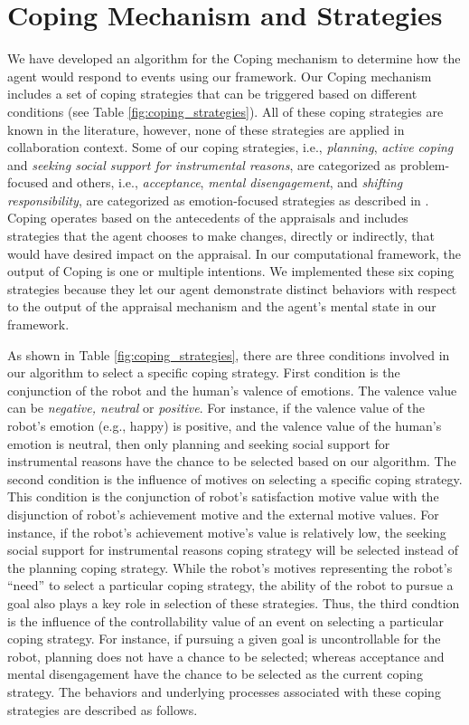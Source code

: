 \documentclass[12pt]{report}
\begin{document}
\section{Coping Mechanism and Strategies}
\label{sec:coping-mechanism}
We have developed an algorithm for the Coping mechanism to determine how the
agent would respond to events using our framework. Our Coping mechanism includes
a set of coping strategies that can be triggered based on different conditions
(see Table \ref{fig:coping_strategies}). All of these coping strategies are
known in the literature, however, none of these strategies are applied in
collaboration context. Some of our coping strategies, i.e., \textit{planning},
\textit{active coping} and \textit{seeking social support for instrumental
reasons}, are categorized as problem-focused and others, i.e.,
\textit{acceptance}, \textit{mental disengagement}, and \textit{shifting
responsibility}, are categorized as emotion-focused strategies as described in
\cite{gratch:domain-independent}. {\color{red}Coping operates based on the
antecedents of the appraisals and includes strategies that the agent chooses to make changes,
directly or indirectly, that would have desired impact on the appraisal. In
our computational framework, the output of Coping is one or multiple
intentions.} We implemented these six coping strategies because they let our
agent demonstrate distinct behaviors with respect to the output of the appraisal
mechanism and the agent's mental state in our framework.

{\color{red}As shown in Table \ref{fig:coping_strategies}, there are three
conditions involved in our algorithm to select a specific coping strategy. First condition
is the conjunction of the robot and the human's valence of emotions. The valence
value can be \textit{negative, neutral} or \textit{positive}. For instance, if
the valence value of the robot's emotion (e.g., happy) is positive, and the
valence value of the human's emotion is neutral, then only planning and seeking
social support for instrumental reasons have the chance to be selected based on
our algorithm. The second condition is the influence of motives on selecting a
specific coping strategy. This condition is the conjunction of robot's
satisfaction motive value with the disjunction of robot's achievement motive and
the external motive values. For instance, if the robot's achievement motive's
value is relatively low, the seeking social support for instrumental reasons
coping strategy will be selected instead of the planning coping strategy. While
the robot's motives representing the robot's ``need'' to select a particular
coping strategy, the ability of the robot to pursue a goal also plays a key role
in selection of these strategies. Thus, the third condtion is the influence of
the controllability value of an event on selecting a particular coping strategy.
For instance, if pursuing a given goal is uncontrollable for the robot, planning
does not have a chance to be selected; whereas acceptance and mental
disengagement have the chance to be selected as the current coping strategy. The
behaviors and underlying processes associated with these coping strategies are
described as follows.}
\end{document}
